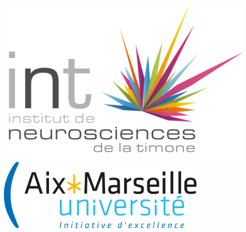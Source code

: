 \documentclass[a0,portrait]{a0poster}
\begin{document}


\begin{minipage}[b]{0.75\linewidth}
\Huge \color{Navy} \textbf{\Title} \color{Black}\\[0.9cm] %
\huge \textbf{\Author} \\[0.9cm] %
\huge \Address\\[0.4cm] %
\Large \texttt{\Email} \\
\end{minipage}
%
\begin{minipage}[b]{0.25\linewidth}
\includegraphics[width=13cm]{Logo_int.png}\ 
\includegraphics[width=10.5cm]{Logo_amu.png}\\
\end{minipage}
\end{document}
